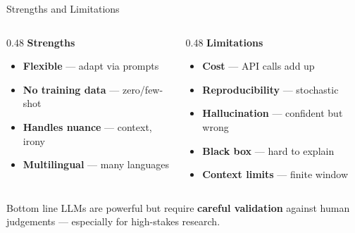 \documentclass[aspectratio=169]{beamer}
\begin{document}
\begin{frame}{Strengths and Limitations}
    \small
    \vspace{-0.1cm}
    \begin{columns}[T]
        \begin{column}{0.48\textwidth}
            \textbf{\color{sgsssGreen} Strengths}
            \begin{itemize}\setlength\itemsep{0pt}
                \item {} \textbf{Flexible} --- adapt via prompts
                \item {} \textbf{No training data} --- zero/few-shot
                \item {} \textbf{Handles nuance} --- context, irony
                \item {} \textbf{Multilingual} --- many languages
            \end{itemize}
        \end{column}
        \begin{column}{0.48\textwidth}
            \textbf{\color{sgsssMagenta} Limitations}
            \begin{itemize}\setlength\itemsep{0pt}
                \item {} \textbf{Cost} --- API calls add up
                \item {} \textbf{Reproducibility} --- stochastic
                \item {} \textbf{Hallucination} --- confident but wrong
                \item {} \textbf{Black box} --- hard to explain
                \item {} \textbf{Context limits} --- finite window
            \end{itemize}
        \end{column}
    \end{columns}

    \vspace{0.15cm}
    \begin{alertblock}{Bottom line}
        LLMs are powerful but require \textbf{careful validation} against human judgements --- especially for high-stakes research.
    \end{alertblock}
\end{frame}
\end{document}
